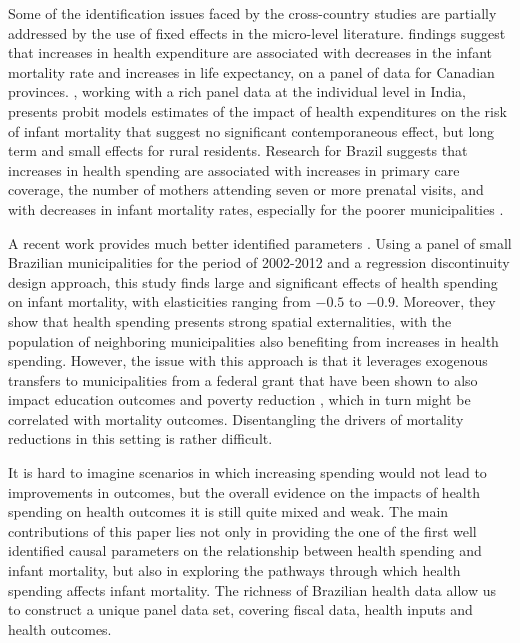 Some of the identification issues faced by the cross-country studies are partially addressed by the use of fixed effects in the micro-level literature. \cite{cremieux1999} findings suggest that increases in health expenditure are associated with decreases in the infant mortality rate and increases in life expectancy, on a panel of data for Canadian provinces. \cite{sonia2007}, working with a rich panel data at the individual level in India, presents probit models estimates of the impact of health expenditures on the risk of infant mortality that suggest no significant contemporaneous effect, but long term and small effects for rural residents. Research for Brazil suggests that increases in health spending are associated with increases in primary care coverage,  the number of mothers attending seven or more prenatal visits, and with decreases in infant mortality rates, especially for the poorer municipalities \citep{paixao2012,Castro2019}. 

A recent work provides much better identified parameters \citep{castro2021effects}. Using a panel of small Brazilian municipalities for the period of 2002-2012 and a regression discontinuity design approach, this study finds large and significant effects of health spending on infant mortality, with elasticities ranging from $-0.5$ to $-0.9$. Moreover, they show that health spending presents strong spatial externalities, with the population of neighboring municipalities also benefiting from increases in health spending. However, the issue with this approach is that it leverages exogenous transfers to municipalities from a federal grant that have been shown to also impact education outcomes and poverty reduction \citep{Litschig2013}, which in turn might be correlated with mortality outcomes. Disentangling the drivers of mortality reductions in this setting is rather difficult. 

It is hard to imagine scenarios in which increasing spending would not lead to improvements in outcomes, but the overall evidence on the impacts of health spending on health outcomes it is still quite mixed and weak. The main contributions of this paper lies not only in providing the one of the first well identified causal parameters on the relationship between health spending and infant mortality, but also in exploring the pathways through which health spending affects infant mortality. The richness of Brazilian health data allow us to construct a unique panel data set, covering fiscal data, health inputs and health outcomes.

